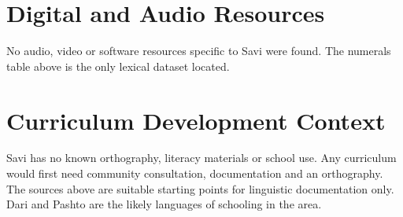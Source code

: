 \documentclass[12pt]{article}
\begin{document}
\section{Digital and Audio Resources}
No audio, video or software resources specific to Savi were found. The numerals table above is the only lexical dataset located.

\section{Curriculum Development Context}
Savi has no known orthography, literacy materials or school use. Any curriculum would first need community consultation, documentation and an orthography. The sources above are suitable starting points for linguistic documentation only. Dari and Pashto are the likely languages of schooling in the area.
\end{document}

